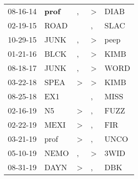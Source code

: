 \begin{supertabular}{p{0.07\textwidth}p{0.06\textwidth}p{0.02\textwidth}p{0.02\textwidth}p{0.06\textwidth}}
          08-16-14\textsuperscript{} &  \textbf{prof\textsuperscript{}} &                , &     \textgreater &           DIAB\textsuperscript{} \\
          02-19-15\textsuperscript{} &           ROAD\textsuperscript{} &                  &                , &           SLAC\textsuperscript{} \\
          10-29-15\textsuperscript{} &           JUNK\textsuperscript{} &                , &     \textgreater &           peep\textsuperscript{} \\
          01-21-16\textsuperscript{} &           BLCK\textsuperscript{} &                , &     \textgreater &           KIMB\textsuperscript{} \\
          08-18-17\textsuperscript{} &           JUNK\textsuperscript{} &                , &     \textgreater &           WORD\textsuperscript{} \\
          03-22-18\textsuperscript{} &           SPEA\textsuperscript{} &     \textgreater &     \textgreater &           KIMB\textsuperscript{} \\
          08-25-18\textsuperscript{} &            EX1\textsuperscript{} &                  &                , &           MISS\textsuperscript{} \\
          02-16-19\textsuperscript{} &             N5\textsuperscript{} &     \textgreater &                , &           FUZZ\textsuperscript{} \\
          02-22-19\textsuperscript{} &           MEXI\textsuperscript{} &     \textgreater &                , &            FIR\textsuperscript{} \\
          03-21-19\textsuperscript{} &           prof\textsuperscript{} &     \textgreater &                , &           UNCO\textsuperscript{} \\
          05-10-19\textsuperscript{} &           NEMO\textsuperscript{} &                , &     \textgreater &           3WID\textsuperscript{} \\
          08-31-19\textsuperscript{} &           DAYN\textsuperscript{} &     \textgreater &                , &            DBK\textsuperscript{} \\
\end{supertabular}
